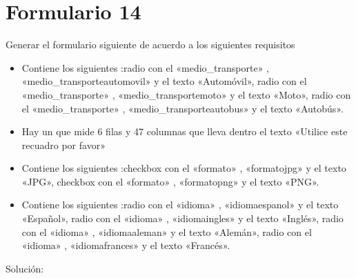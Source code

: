 \documentclass[letterpaper,10pt,spanish]{sphinxmanual}
\begin{document}
\section{Formulario 14}
\label{\detokenize{ejercicios/formularios/anexo_formularios:formulario-14}}
Generar el formulario siguiente de acuerdo a los siguientes requisitos
\begin{itemize}
\item {} 
Contiene los siguientes :radio con el   «medio\_transporte» ,   «medio\_transporteautomovil»  y el texto «Automóvil», radio con el   «medio\_transporte» ,   «medio\_transportemoto»  y el texto «Moto», radio con el   «medio\_transporte» ,   «medio\_transporteautobus»  y el texto «Autobús».

\item {} 
Hay un  que mide 6 filas y 47 columnas que lleva dentro el texto «Utilice este recuadro por favor»

\item {} 
Contiene los siguientes :checkbox con el   «formato» ,   «formatojpg»  y el texto «JPG», checkbox con el   «formato» ,   «formatopng»  y el texto «PNG».

\item {} 
Contiene los siguientes :radio con el   «idioma» ,   «idiomaespanol»  y el texto «Español», radio con el   «idioma» ,   «idiomaingles»  y el texto «Inglés», radio con el   «idioma» ,   «idiomaaleman»  y el texto «Alemán», radio con el   «idioma» ,   «idiomafrances»  y el texto «Francés».

\end{itemize}


Solución:
\end{document}
